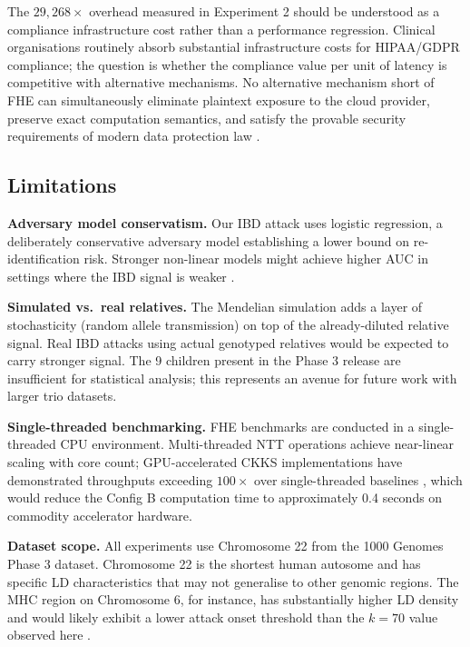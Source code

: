 \documentclass[conference]{IEEEtran}
\begin{document}
The $29{,}268\times$ overhead measured in Experiment 2 should be understood as
a compliance infrastructure cost rather than a performance regression. Clinical
organisations routinely absorb substantial infrastructure costs for HIPAA/GDPR
compliance; the question is whether the compliance value per unit of latency is
competitive with alternative mechanisms. No alternative mechanism short of FHE
can simultaneously eliminate plaintext exposure to the cloud provider, preserve
exact computation semantics, and satisfy the provable security requirements of
modern data protection law \cite{cho2024,raisaro2018}.

\subsection{Limitations}

\textbf{Adversary model conservatism.} Our IBD attack uses logistic regression,
a deliberately conservative adversary model establishing a lower bound on
re-identification risk. Stronger non-linear models might achieve higher AUC
in settings where the IBD signal is weaker \cite{shringarpure2015}.

\textbf{Simulated vs.\ real relatives.} The Mendelian simulation adds a layer
of stochasticity (random allele transmission) on top of the already-diluted
relative signal. Real IBD attacks using actual genotyped relatives would be
expected to carry stronger signal. The 9 children present in the Phase 3
release are insufficient for statistical analysis; this represents an avenue
for future work with larger trio datasets.

\textbf{Single-threaded benchmarking.} FHE benchmarks are conducted in a
single-threaded CPU environment. Multi-threaded NTT operations achieve
near-linear scaling with core count; GPU-accelerated CKKS implementations
have demonstrated throughputs exceeding $100\times$ over single-threaded
baselines \cite{jung2021,jin2025}, which would reduce the Config B computation
time to approximately 0.4 seconds on commodity accelerator hardware.

\textbf{Dataset scope.} All experiments use Chromosome 22 from the 1000 Genomes
Phase 3 dataset. Chromosome 22 is the shortest human autosome and has specific
LD characteristics that may not generalise to other genomic regions. The MHC
region on Chromosome 6, for instance, has substantially higher LD density and
would likely exhibit a lower attack onset threshold than the $k=70$ value
observed here \cite{gursoy2022functional}.
\end{document}
